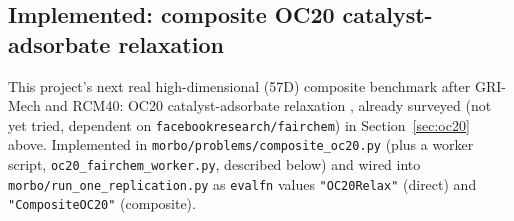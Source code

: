 \documentclass[11pt]{article}
\begin{document}
\subsection{Implemented: composite OC20 catalyst-adsorbate relaxation}
\label{sec:oc20-implemented}

This project's next real high-dimensional (57D) composite benchmark
after GRI-Mech and RCM40: OC20 catalyst-adsorbate relaxation
\citep{chanussot2021oc20}, already surveyed (not yet tried, dependent
on \texttt{facebookresearch/fairchem}) in Section~\ref{sec:oc20} above.
Implemented in \texttt{morbo/\allowbreak problems/\allowbreak composite\_oc20.py} (plus
a worker script, \texttt{oc20\_fairchem\_worker.py}, described below) and
wired into \texttt{morbo/\allowbreak run\_one\_replication.py} as
\texttt{evalfn} values \texttt{"OC20Relax"} (direct) and
\texttt{"CompositeOC20"} (composite).
\end{document}
